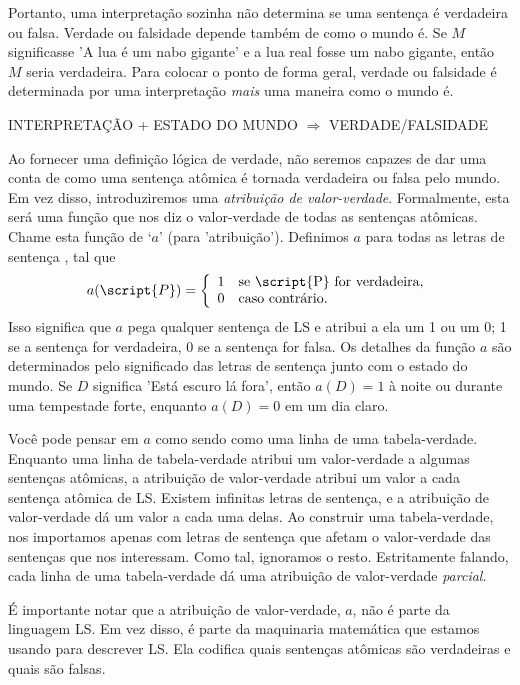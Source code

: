 Portanto, uma interpretação sozinha não determina se uma sentença é verdadeira ou falsa. Verdade ou falsidade depende também de como o mundo é. Se $M$ significasse 'A lua é um nabo gigante' e a lua real fosse um nabo gigante, então $M$ seria verdadeira. Para colocar o ponto de forma geral, verdade ou falsidade é determinada por uma interpretação \emph{mais} uma maneira como o mundo é.

\begin{center}
INTERPRETAÇÃO + ESTADO DO MUNDO $\Longrightarrow$ VERDADE/FALSIDADE
\end{center}

Ao fornecer uma definição lógica de verdade, não seremos capazes de dar uma conta de como uma sentença atômica é tornada verdadeira ou falsa pelo mundo. Em vez disso, introduziremos uma \emph{atribuição de valor-verdade}. Formalmente, esta será uma função que nos diz o valor-verdade de todas as sentenças atômicas. Chame esta função de `$a$' (para 'atribuição'). Definimos $a$ para todas as letras de sentença , tal que
\begin{displaymath}
a(\script{P}) =
\left\{
	\begin{array}{ll}
	1 & \mbox{se \script{P} for verdadeira},\\
	0 & \mbox{caso contrário.}
	\end{array}
\right.
\end{displaymath}
Isso significa que $a$ pega qualquer sentença de LS e atribui a ela um 1 ou um 0; 1 se a sentença for verdadeira, 0 se a sentença for falsa. Os detalhes da função $a$ são determinados pelo significado das letras de sentença junto com o estado do mundo. Se $D$ significa 'Está escuro lá fora', então $a(D)=1$ à noite ou durante uma tempestade forte, enquanto $a(D)=0$ em um dia claro.

Você pode pensar em $a$ como sendo como uma linha de uma tabela-verdade. Enquanto uma linha de tabela-verdade atribui um valor-verdade a algumas sentenças atômicas, a atribuição de valor-verdade atribui um valor a cada sentença atômica de LS. Existem infinitas letras de sentença, e a atribuição de valor-verdade dá um valor a cada uma delas. Ao construir uma tabela-verdade, nos importamos apenas com letras de sentença que afetam o valor-verdade das sentenças que nos interessam. Como tal, ignoramos o resto. Estritamente falando, cada linha de uma tabela-verdade dá uma atribuição de valor-verdade \emph{parcial}.

É importante notar que a atribuição de valor-verdade, $a$, não é parte da linguagem LS. Em vez disso, é parte da maquinaria matemática que estamos usando para descrever LS. Ela codifica quais sentenças atômicas são verdadeiras e quais são falsas.

